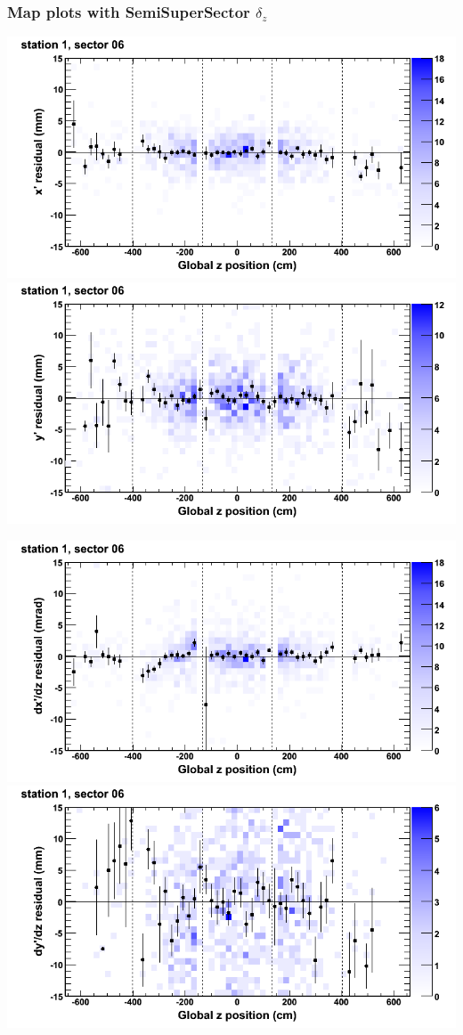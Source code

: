 \documentclass[compress]{beamer}
\begin{document}
\begin{frame}
\frametitle{Map plots with SemiSuperSector $\delta_z$}
\includegraphics[width=0.5\linewidth]{zfit_mapplots/DTvsz_st1sec06_x.png}
\includegraphics[width=0.5\linewidth]{zfit_mapplots/DTvsz_st1sec06_y.png}

\includegraphics[width=0.5\linewidth]{zfit_mapplots/DTvsz_st1sec06_dxdz.png}
\includegraphics[width=0.5\linewidth]{zfit_mapplots/DTvsz_st1sec06_dydz.png}
\end{frame}
\end{document}
